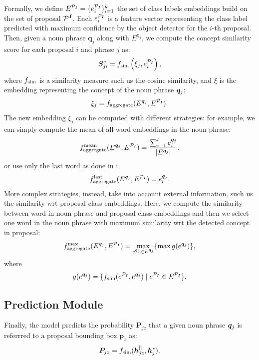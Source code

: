 \documentclass{article}
\begin{document}
Formally, we define $E^{\mathcal{P}_{\bm{I}}} = \{e^{\mathcal{P}_{\bm{I}}}_i \}^{k}_{i=1}$ the set of class
labels embeddings build on the set of proposal $\mathcal{P}^{\bm{I}}$. Each
$e^{\mathcal{P}_{\bm{I}}}_i$ is a feature vector representing the class label predicted
with maximum confidence by the object detector for the $i$-th
proposal. Then, given a noun phrase $\bm{q}_j$ along with
$E^{\bm{q}_j}$, we compute the concept similarity score for each
proposal $i$ and phrase $j$ as:
\begin{equation}
  \bm{S}^c_{ji} = f_{\text{sim}} \left( \xi_j, e^{\mathcal{P}_{\bm{I}}}_i \right),
\end{equation}
where $f_{\text{sim}}$ is a similarity measure such us the cosine similarity,
and $\xi$ is the embedding representing the concept of the noun phrase
$\bm{q}_j$:
\begin{equation}
  \xi_j = f_{\text{aggregate}}(E^{\bm{q}_j}, E^{\mathcal{P}_{\bm{I}}}).
\end{equation}
The new embedding $\xi_j$ can be computed with different strategies: for
example, we can simply compute the mean of all word embeddings in the
noun phrase:
\begin{equation}
  f_{\text{aggregate}}^{\text{mean}}(E^{\bm{q}_j}, E^{\mathcal{P}_{\bm{I}}}) = \frac{\sum^l_{i=1} e^{\bm{q}_j}_i}{| E^{\bm{q}_j} |},
\end{equation}
or use only the last word as done in \cite{wang2019phrase}:
\begin{equation}
  f_{\text{aggregate}}^{\text{last}}(E^{\bm{q}_j}, E^{\mathcal{P}_{\bm{I}}}) = e^{\bm{q}_j}_l.
\end{equation}
More complex strategies, instead, take into account external
information, such us the similarity wrt proposal class embeddings.
Here, we compute the similarity between word in noun phrase and
proposal class embeddings and then we select one word in the noun
phrase with maximum similarity wrt the detected concept in proposal:
\begin{equation}
  f_{\text{aggregate}}^{\text{max}}(E^{\bm{q}_j}, E^{\mathcal{P}_{\bm{I}}}) = \max_{e^{\bm{q}_j} \in E^{\bm{q}_j}} \{ \max g(e^{\bm{q}_j}) \},
\end{equation}
where
\begin{equation}
  g(e^{\bm{q}_j}) = \{ f_{\text{sim}}(e^{\mathcal{P}_{\bm{I}}}, e^{\bm{q}_j}) \mid e^{\mathcal{P}_{\bm{I}}} \in E^{\mathcal{P}_{\bm{I}}} \}.
\end{equation}

\subsection{Prediction Module}

Finally, the model predicts the probability $\bm{P}_{jz}$ that a given
noun phrase $\bm{q}_j$ is referrred to a proposal bounding box $\bm{p}_z$
as:
\begin{equation}
  \bm{P}_{jz} = f_{\text{sim}} ( \bm{h}^{||}_{jz} , \bm{h}^*_j ).
\end{equation}
\end{document}
